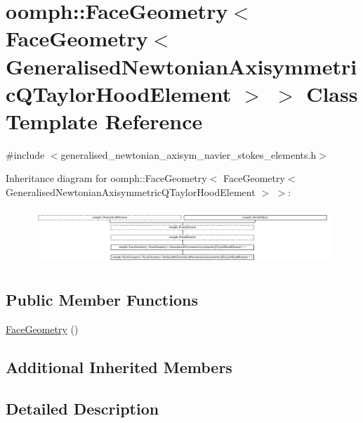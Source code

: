 \hypertarget{classoomph_1_1FaceGeometry_3_01FaceGeometry_3_01GeneralisedNewtonianAxisymmetricQTaylorHoodElement_01_4_01_4}{}\section{oomph\+:\+:Face\+Geometry$<$ Face\+Geometry$<$ Generalised\+Newtonian\+Axisymmetric\+Q\+Taylor\+Hood\+Element $>$ $>$ Class Template Reference}
\label{classoomph_1_1FaceGeometry_3_01FaceGeometry_3_01GeneralisedNewtonianAxisymmetricQTaylorHoodElement_01_4_01_4}


{\ttfamily \#include $<$generalised\+\_\+newtonian\+\_\+axisym\+\_\+navier\+\_\+stokes\+\_\+elements.\+h$>$}

Inheritance diagram for oomph\+:\+:Face\+Geometry$<$ Face\+Geometry$<$ Generalised\+Newtonian\+Axisymmetric\+Q\+Taylor\+Hood\+Element $>$ $>$\+:\begin{figure}[H]
\begin{center}
\leavevmode
\includegraphics[height=2.127660cm]{classoomph_1_1FaceGeometry_3_01FaceGeometry_3_01GeneralisedNewtonianAxisymmetricQTaylorHoodElement_01_4_01_4}
\end{center}
\end{figure}
\subsection*{Public Member Functions}
\begin{DoxyCompactItemize}
\item 
\hyperlink{classoomph_1_1FaceGeometry_3_01FaceGeometry_3_01GeneralisedNewtonianAxisymmetricQTaylorHoodElement_01_4_01_4_a66f4e14c0a04313425d2460300d828fe}{Face\+Geometry} ()
\end{DoxyCompactItemize}
\subsection*{Additional Inherited Members}


\subsection{Detailed Description}
